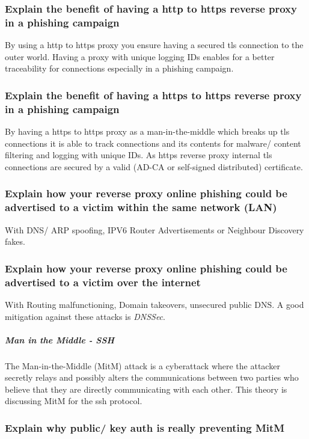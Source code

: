 \subsubsection{Explain the benefit of having a http to https reverse proxy in a phishing campaign}
By using a http to https proxy you ensure having a secured tls connection to the outer world. Having a proxy with unique logging IDs enables for a better traceability for connections especially in a phishing campaign.

\subsubsection{Explain the benefit of having a https to https reverse proxy in a phishing campaign}
By having a https to https proxy as a man-in-the-middle which breaks up tls connections it is able to track connections and its contents for malware/ content filtering and logging with unique IDs. As https reverse proxy internal tls connections are secured by a valid (AD-CA or self-signed distributed) certificate.

\subsubsection{Explain how your reverse proxy online phishing could be advertised to a victim within the same network (LAN)}
With DNS/ ARP spoofing, IPV6 Router Advertisements or Neighbour Discovery fakes.

\subsubsection{Explain how your reverse proxy online phishing could be advertised to a victim over the internet}
With Routing malfunctioning, Domain takeovers, unsecured public DNS. A good mitigation against these attacks is \textit{DNSSec}.

\columnbreak

\subparagraph{Man in the Middle - SSH}
The Man-in-the-Middle (MitM) attack is a cyberattack where the attacker secretly relays and possibly alters the communications between two parties who believe that they are directly communicating with each other. This theory is discussing MitM for the ssh protocol.

\subsubsection{Explain why public/ key auth is really preventing MitM}

